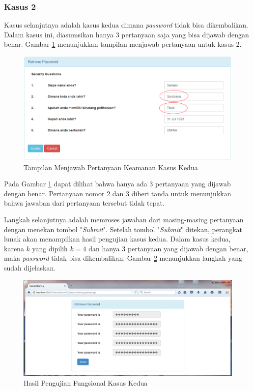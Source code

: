 \subsubsection{Kasus 2}

Kasus selanjutnya adalah kasus kedua dimana \textit{password} tidak bisa dikembalikan. Dalam kasus ini, diasumsikan hanya 3 pertanyaan saja yang bisa dijawab dengan benar. Gambar \ref{fig:fungsional4} menunjukkan tampilan menjawab pertanyaan untuk kasus 2.

\begin{figure}[H]
	\includegraphics[scale=0.6]{Gambar/fungsional4}
	\centering
	\caption{Tampilan Menjawab Pertanyaan Keamanan Kasus Kedua}\label{fig:fungsional4}
\end{figure}

Pada Gambar \ref{fig:fungsional4} dapat dilihat bahwa hanya ada 3 pertanyaan yang dijawab dengan benar. Pertanyaan nomor 2 dan 3 diberi tanda untuk menunjukkan bahwa jawaban dari pertanyaan tersebut tidak tepat.

Langkah selanjutnya adalah memroses jawaban dari masing-masing pertanyaan dengan menekan tombol "\textit{Submit}". Setelah tombol "\textit{Submit}" ditekan, perangkat lunak akan menampilkan hasil pengujian kasus kedua. Dalam kasus kedua, karena $k$ yang dipilih $k=4$ dan hanya 3 pertanyaan yang dijawab dengan benar, maka \textit{password} tidak bisa dikembalikan. Gambar \ref{fig:fungsional5} menunjukkan langkah yang sudah dijelaskan.

\begin{figure}[H]
	\includegraphics[scale=0.6]{Gambar/fungsional5}
	\centering
	\caption{Hasil Pengujian Fungsional Kasus Kedua}\label{fig:fungsional5}
\end{figure}

